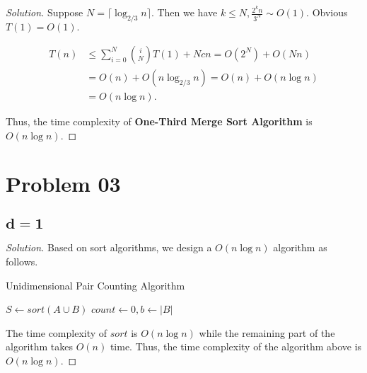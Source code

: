 \documentclass{article}
\newenvironment{solution}{\begin{proof}[\noindent\it Solution]}{\end{proof}}
\begin{document}
\begin{solution}
    \hspace{1.3em}
    Suppose $N=\lceil\log_{2/3}n\rceil.$ Then we have $k\le N, \frac{2^kn}{3^N}\sim O(1).$ Obvious $T(1)=O(1).$
    
    \vspace{-1.75em}
    \begin{align*}
        T(n) &\le \sum_{i=0}^{N} \binom{i}{N} T(1) + Ncn = O(2^N) + O(Nn) \\
        &= O(n) + O(n\log_{2/3}{n}) = O(n) + O(n\log n ) \\
        &= O(n\log n).
    \end{align*}
    
    \hspace{1.3em}
    Thus, the time complexity of \textbf{One-Third Merge Sort Algorithm} is $O(n\log n).$
\end{solution}

\vspace{5em}

\section{Problem 03}
\vspace{.5em}

\subsection{$\boldsymbol{d=1}$}
\vspace{1em}
\begin{solution}
    Based on sort algorithms, we design a $O(n\log n)$ algorithm as follows.


    \begin{algorithm}
        \caption{Unidimensional Pair Counting Algorithm}
        
	    {
	        $S \gets sort\left(A\cup B\right)$\;
	        \qquad\qquad{}
	        \BlankLine
	        \BlankLine
	        \BlankLine
	        $count\gets 0, b\gets |B|$\;
	        {
	        }
	    }
    \end{algorithm}
    
    \hspace{2.5em}
    The time complexity of $sort$ is $O(n\log n)$ while the remaining part of the algorithm takes $O(n)$ time. Thus, the time complexity of the algorithm above is $O(n\log n)$.
\end{solution}
\end{document}
